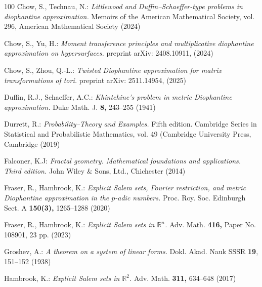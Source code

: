 \documentclass[12pt,a4paper,twoside]{article}
\begin{document}
\begin{thebibliography}{100}
Chow, S., Technau, N.:
\textit{Littlewood and Duffin--Schaeffer-type problems in diophantine approximation.} Memoirs of the American Mathematical Society, vol. 296, American Mathematical Society (2024)



Chow, S.,  Yu, H.:
\textit{Moment transference principles and multiplicative diophantine approximation on hypersurfaces.}
 preprint arXiv: 2408.10911, (2024)


 Chow, S.,  Zhou, Q.-L.:
\textit{Twisted Diophantine approximation for matrix transformations of tori.}
 preprint arXiv: 2511.14954, (2025)



 Duffin, R.J.,   Schaeffer,  A.C.:
\textit{Khintchine's problem in metric Diophantine approximation.}
Duke Math. J. {\bf 8,} 243--255  (1941)



  Durrett, R.:
\textit{Probability--Theory and Examples.} Fifth edition. Cambridge Series in Statistical and Probabilistic Mathematics, vol. 49 (Cambridge University Press, Cambridge (2019)


  Falconer, K.J:
\textit{Fractal geometry. Mathematical foundations and applications. Third edition.}
            John Wiley \& Sons, Ltd., Chichester (2014)



 Fraser, R.,   Hambrook, K.:
\textit{Explicit Salem sets, Fourier restriction, and metric Diophantine approximation in the $p$-adic numbers.}
Proc. Roy. Soc. Edinburgh Sect. A  {\bf 150(3),}  1265--1288  (2020)



Fraser, R.,   Hambrook, K.:
\textit{Explicit Salem sets in $\mathbb{R}^{n}$.}
Adv. Math. {\bf 416,}  Paper No. 108901, 23 pp. (2023)





 Groshev, A.:
\textit{A theorem on a system of linear forms.}
Dokl. Akad. Nauk SSSR {\bf 19},  151--152 (1938)



 Hambrook, K.:
\textit{Explicit Salem sets in $\mathbb{R}^{2}$.}
Adv. Math. {\bf 311,}  634--648 (2017)




\end{thebibliography}
\end{document}
